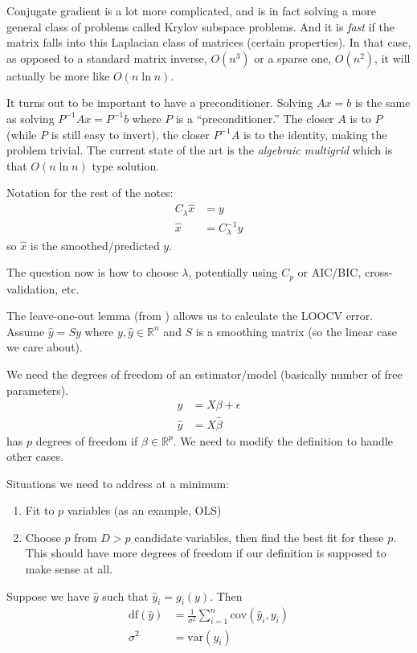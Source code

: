 \documentclass{article}
\begin{document}
Conjugate gradient is a lot more complicated, and is in fact solving a more general class of problems called Krylov subspace
problems. And it is \emph{fast} if the matrix falls into this
Laplacian class of matrices (certain properties). In that case, as opposed to a standard matrix inverse, $O(n^3)$ or
a sparse one, $O(n^2)$, it will actually be more like $O(n \ln n)$.

It turns out to be important to have a preconditioner. Solving $Ax=b$ is the same as solving $P^{-1}Ax=P^{-1}b$
where $P$ is a ``preconditioner.'' The closer $A$ is to $P$ (while $P$ is still easy to invert), the closer $P^{-1}A$ 
is to the identity, making the problem trivial. The current state of the art is the \emph{algebraic multigrid}
which is that $O(n \ln n)$ type solution.

\vspace{5ex} 

Notation for the rest of the notes:
\begin{align*}
C_\lambda\hat{x}&=y\\
\hat{x}&=C_\lambda^{-1}y
\end{align*}
so $\hat{x}$ is the smoothed/predicted $y$.

The question now is how to choose $\lambda$, potentially using $C_p$ or AIC/BIC, cross-validation, etc.

The leave-one-out lemma (from \cite{hastie2001elements})
allows us to calculate the LOOCV error. Assume $\hat{y}=Sy$
where $y,\hat{y}\in \mathbb{R}^n$ and $S$ is a smoothing matrix (so the linear case we care about).

We need the degrees of freedom of an estimator/model (basically number of free parameters).
\begin{align*}
y&=X\beta + \epsilon\\
\hat{y}&=X\hat{\beta}
\end{align*}
has $p$ degrees of freedom if $\beta\in\mathbb{R}^p$. We need to modify the definition to handle other cases.

Situations we need to address at a minimum:
\begin{enumerate}[1.]
\item Fit to $p$ variables (as an example, OLS)
\item Choose $p$ from $D>p$ candidate variables, then find the best fit for these $p$. This should have more degrees
of freedom if our definition is supposed to make sense at all.
\end{enumerate}

Suppose we have $\hat{y}$ such that $\hat{y}_i=g_i(y)$. Then
\begin{align*}
\textrm{df}(\hat{y}) &= \frac{1}{\sigma^2} \sum_{i=1}^n \textrm{cov}(\hat{y}_i, y_i)\\
\sigma^2&=\textrm{var}(y_i)
\end{align*}
\end{document}
